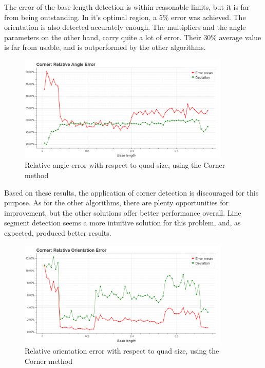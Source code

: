The error of the base length detection is within reasonable limits, but it is far from being outstanding.
In it's optimal region, a $5\%$ error was achieved.
The orientation is also detected accurately enough.
The multipliers and the angle parameters on the other hand, carry quite a lot of error.
Their $30\%$ average value is far from usable, and is outperformed by the other algorithms.
\begin{figure}[ht]
	\centering
	\includegraphics[width=0.9\textwidth]{figures/plots/corner_relative_angle_error.png}
	\caption{Relative angle error with respect to quad size, using the Corner method}
	\label{fig:cornerRelAngleErr}
\end{figure}

Based on these results, the application of corner detection is discouraged for this purpose.
As for the other algorithms, there are plenty opportunities for improvement, but the other solutions offer better performance overall.
Line segment detection seems a more intuitive solution for this problem, and, as expected, produced better results.
\begin{figure}[ht]
	\centering
	\includegraphics[width=0.9\textwidth]{figures/plots/corner_relative_orientation_error.png}
	\caption{Relative orientation error with respect to quad size, using the Corner method}
	\label{fig:cornerRelOrientErr}
\end{figure}

